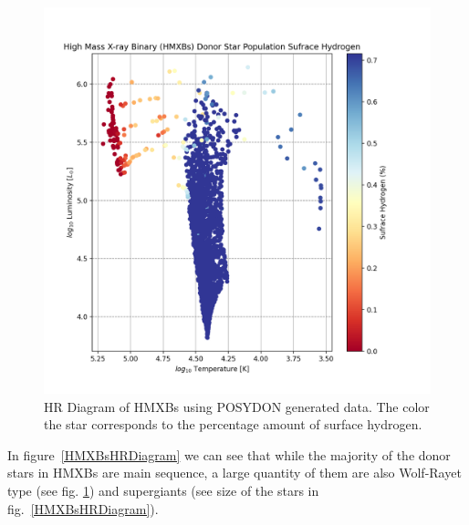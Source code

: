 \documentclass[12pt, a4paper]{article}
\begin{document}
        \begin{figure}[H] 
            \centering
            \includegraphics[scale = .4]{figs/GeneratedFigs/VelaX-1/HMXBsSurfaceCompHRDiagram.png}
            \caption{HR Diagram of HMXBs using POSYDON generated data. The color the star corresponds to the percentage amount of surface hydrogen.}
            \label{HMXBsSurfaceCompHRDiagram}
        \end{figure}

        In figure~\ref{HMXBsHRDiagram} we can see that while the majority of the donor stars in HMXBs are main sequence, a large quantity of them are also Wolf-Rayet type (see fig. \ref{HMXBsSurfaceCompHRDiagram}) and supergiants (see size of the stars in fig.~\ref{HMXBsHRDiagram}).  
\end{document}
